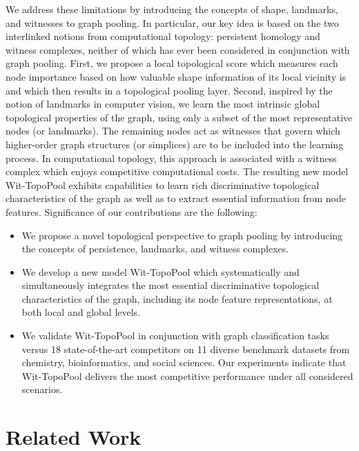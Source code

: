 \documentclass[letterpaper]{article} %
\begin{document}
We address these limitations by introducing the concepts of shape, landmarks, and witnesses  to graph pooling. In particular, our key idea is based on the two interlinked notions from computational topology: persistent homology and witness complexes, neither of which has ever been considered in conjunction with graph pooling. First, we propose a local topological score which measures each node importance based on how valuable shape information of its local vicinity is and which then results in a topological pooling layer. Second, inspired by the notion of landmarks in computer vision, we learn the most intrinsic global topological properties of the graph, using only a subset of the most representative nodes (or landmarks).
The remaining nodes act as witnesses that govern which higher-order graph structures (or simplices) are to be included into the learning process. In computational topology, this approach is associated with a witness complex which enjoys competitive computational costs. The resulting new model Wit-TopoPool exhibits capabilities to learn rich discriminative topological characteristics of the graph as well as to extract essential information from node features. Significance of our contributions are the following:
\begin{itemize}[leftmargin=*]
\item We propose a novel topological perspective to graph pooling by introducing the concepts of persistence, landmarks, and witness complexes.

\item We develop a new model Wit-TopoPool which systematically and simultaneously integrates the most essential discriminative topological characteristics of the graph, including its node feature representations, at both local and global levels.

\item We validate Wit-TopoPool in conjunction with graph classification tasks versus 18 state-of-the-art competitors on 11 diverse benchmark datasets from chemistry, bioinformatics, and social sciences.
Our experiments indicate that Wit-TopoPool delivers the most competitive performance under all considered scenarios.

\end{itemize}






\section{Related Work}
\end{document}
